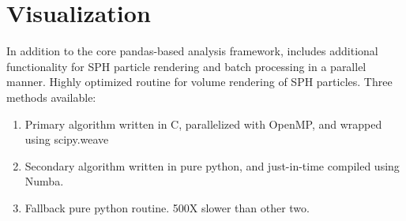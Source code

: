 \section{Visualization}
\label{sec:vis}
In addition to the core pandas-based analysis framework,  includes additional functionality for SPH particle rendering and batch processing in a parallel manner.
Highly optimized routine for volume rendering of SPH particles.  Three methods available:
\begin{enumerate}
\item Primary algorithm written in C, parallelized with OpenMP, and wrapped using scipy.weave
\item Secondary algorithm written in pure python, and just-in-time compiled using Numba.
\item Fallback pure python routine.  500X slower than other two.
\end{enumerate}